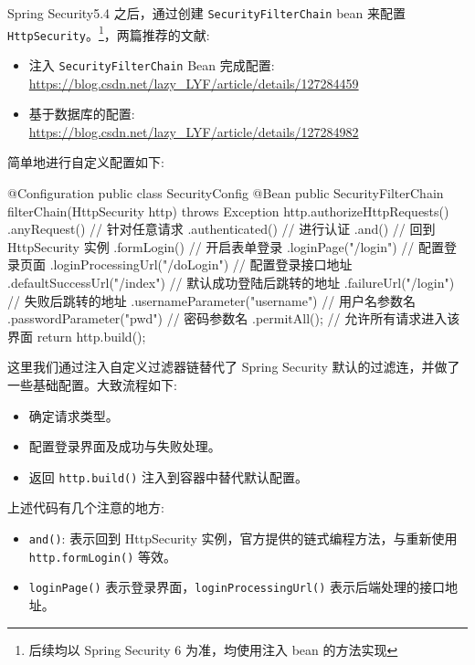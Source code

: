 Spring Security5.4 之后，通过创建 \texttt{SecurityFilterChain} bean 来配置 \texttt{HttpSecurity}。\footnote{后续均以 Spring Security 6 为准，均使用注入 bean 的方法实现}，两篇推荐的文献:
\begin{itemize}
  \item 注入 \texttt{SecurityFilterChain} Bean 完成配置: \url{https://blog.csdn.net/lazy_LYF/article/details/127284459}
  \item 基于数据库的配置: \url{https://blog.csdn.net/lazy_LYF/article/details/127284982}
\end{itemize}

简单地进行自定义配置如下:

\begin{Java}
@Configuration
public class SecurityConfig {
    @Bean
    public SecurityFilterChain filterChain(HttpSecurity http) throws Exception {
        http.authorizeHttpRequests()
                .anyRequest()     // 针对任意请求
                .authenticated()  // 进行认证
                .and()            // 回到 HttpSecurity 实例
                .formLogin()      // 开启表单登录
                .loginPage("/login")  // 配置登录页面
                .loginProcessingUrl("/doLogin") // 配置登录接口地址
                .defaultSuccessUrl("/index")    // 默认成功登陆后跳转的地址
                .failureUrl("/login") // 失败后跳转的地址
                .usernameParameter("username")  // 用户名参数名
                .passwordParameter("pwd")       // 密码参数名
                .permitAll();     // 允许所有请求进入该界面
        return http.build();
    }
}
\end{Java}

这里我们通过注入自定义过滤器链替代了 Spring Security 默认的过滤连，并做了一些基础配置。大致流程如下:
\begin{itemize}
  \item 确定请求类型。
  \item 配置登录界面及成功与失败处理。
  \item 返回 \texttt{http.build()} 注入到容器中替代默认配置。
\end{itemize}

上述代码有几个注意的地方:
\begin{itemize}
  \item \texttt{and()}: 表示回到 HttpSecurity 实例，官方提供的链式编程方法，与重新使用 \texttt{http.formLogin()} 等效。
  \item \texttt{loginPage()} 表示登录界面，\texttt{loginProcessingUrl()} 表示后端处理的接口地址。
\end{itemize}

